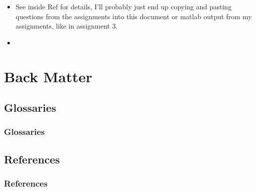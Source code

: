 \documentclass{beamer}
\begin{document}
\begin{frame}
 \begin{itemize}
 	\item See inside Ref for details, I'll probably just end up copying and pasting questions from the assignments into this document or matlab output from my assignments, like in assignment 3.
 	\item
 \end{itemize}
\end{frame}
\section{Back Matter}
\subsection{Glossaries}
\begin{frame}[allowframebreaks]
\frametitle{Glossaries}
\printglossaries
\end{frame}
\subsection{References}
\begin{frame}[allowframebreaks]%
\frametitle{References}
{\footnotesize
	 \printbibliography
}
\end{frame}

\end{document}
